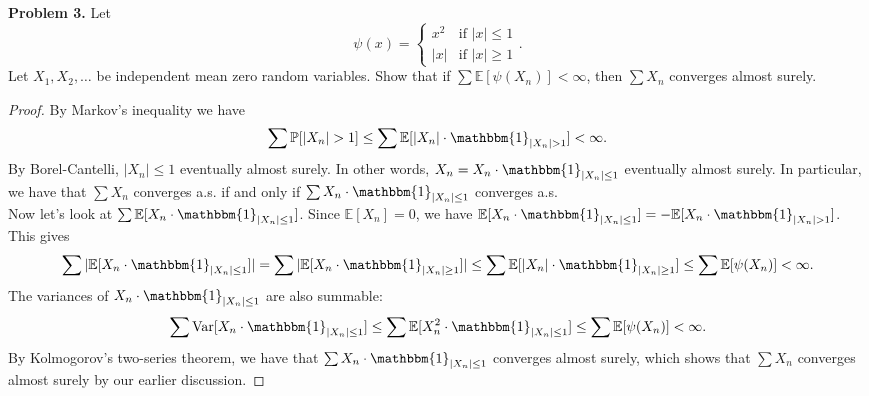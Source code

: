 \documentclass[11pt,letterpaper]{report}
\newcommand{\E}{\mathbb{E}}
\newcommand{\Prob}{\mathbb{P}}
\newcommand{\Var}{\text{Var}}
\newcommand{\ind}{\mathbbm{1}}
\begin{document}
\noindent\textbf{Problem 3. }
Let
\[
\psi(x) = \begin{cases}
	x^2&\text{if }|x|\leq 1\\
	|x|&\text{if }|x|\geq 1
\end{cases}.
\]
Let $X_1, X_2, \ldots$ be independent mean zero random variables. Show that if $\sum \E[\psi(X_n)]<\infty$, then $\sum X_n$ converges almost surely.
\begin{proof}

	By Markov's inequality we have
	\[
	\sum \Prob[|X_n| > 1] \leq \sum \E[|X_n| \cdot \ind_{|X_n|> 1}] < \infty.
	\]
	By Borel-Cantelli, $|X_n| \leq 1$ eventually almost surely. In other words, $X_n = X_n\cdot \ind_{|X_n| \leq 1}$ eventually almost surely. In particular, we have that $\sum X_n$ converges a.s. if and only if $\sum X_n \cdot \ind_{|X_n|\leq 1}$ converges a.s.\\

	\noindent Now let's look at $\sum \E[X_n \cdot \ind_{|X_n|\leq 1}]$. Since $\E[X_n] = 0$, we have $\E[X_n \cdot \ind_{|X_n|\leq 1}] = -\E[X_n \cdot \ind_{|X_n|>1}]$. This gives
	\begin{align*}
		\sum |\E[X_n\cdot \ind_{|X_n|\leq 1}]| = \sum |\E[X_n \cdot \ind_{|X_n| \geq 1}]| \leq \sum \E[|X_n|\cdot \ind_{|X_n|\geq 1}] \leq \sum \E[\psi(X_n)] < \infty.
	\end{align*}
	The variances of $X_n \cdot \ind_{|X_n|\leq 1}$ are also summable:
	\begin{align*}
		\sum \Var[X_n \cdot \ind_{|X_n|\leq 1}] \leq \sum \E[X_n^2 \cdot \ind_{|X_n| \leq 1}] \leq \sum \E[\psi(X_n)] < \infty.
	\end{align*}
	By Kolmogorov's two-series theorem, we have that $\sum X_n \cdot \ind_{|X_n|\leq 1}$ converges almost surely, which shows that $\sum X_n$ converges almost surely by our earlier discussion.
\end{proof}
\end{document}
